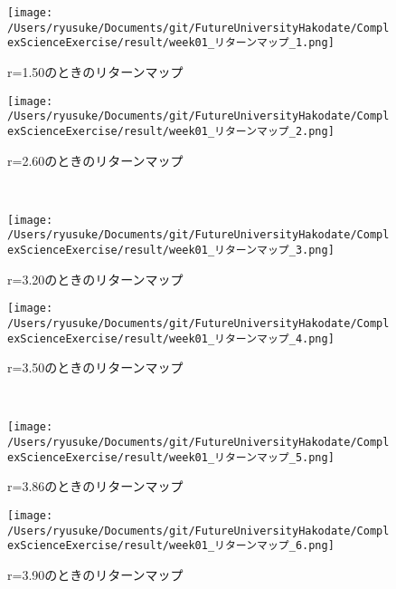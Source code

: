 \documentclass[dvipdfmx,uplatex]{jsarticle}
\begin{document}
 \begin{figure}[htbp]
  \begin{minipage}{0.5\hsize}
   \begin{center}
    \texttt{[image: /Users/ryusuke/Documents/git/FutureUniversityHakodate/ComplexScienceExercise/result/week01\_リターンマップ\_1.png]}
   \end{center}
   \caption{r=1.50のときのリターンマップ}
   \label{fig:seven}
  \end{minipage}
  \begin{minipage}{0.5\hsize}
   \begin{center}
    \texttt{[image: /Users/ryusuke/Documents/git/FutureUniversityHakodate/ComplexScienceExercise/result/week01\_リターンマップ\_2.png]}
   \end{center}
   \caption{r=2.60のときのリターンマップ}
   \label{fig:eight}
  \end{minipage} \\
  \begin{minipage}{0.5\hsize}
   \begin{center}
    \texttt{[image: /Users/ryusuke/Documents/git/FutureUniversityHakodate/ComplexScienceExercise/result/week01\_リターンマップ\_3.png]}
   \end{center}
   \caption{r=3.20のときのリターンマップ}
   \label{fig:nine}
  \end{minipage}
  \begin{minipage}{0.5\hsize}
   \begin{center}
    \texttt{[image: /Users/ryusuke/Documents/git/FutureUniversityHakodate/ComplexScienceExercise/result/week01\_リターンマップ\_4.png]}
   \end{center}
   \caption{r=3.50のときのリターンマップ}
   \label{fig:ten}
  \end{minipage} \\
  \begin{minipage}{0.5\hsize}
   \begin{center}
    \texttt{[image: /Users/ryusuke/Documents/git/FutureUniversityHakodate/ComplexScienceExercise/result/week01\_リターンマップ\_5.png]}
   \end{center}
   \caption{r=3.86のときのリターンマップ}
   \label{fig:eleven}
  \end{minipage}
  \begin{minipage}{0.5\hsize}
   \begin{center}
    \texttt{[image: /Users/ryusuke/Documents/git/FutureUniversityHakodate/ComplexScienceExercise/result/week01\_リターンマップ\_6.png]}
   \end{center}
   \caption{r=3.90のときのリターンマップ}
   \label{fig:twelve}
  \end{minipage}
 \end{figure}
\end{document}
